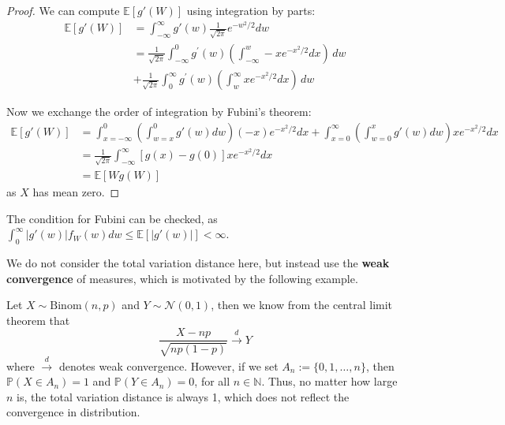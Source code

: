 \documentclass{article}
\begin{document}
\begin{proof}
    We can compute $\mathbb{E}[g'(W)]$ using integration by parts:
    \begin{align*}
        \mathbb{E}[g'(W)] &= \int_{-\infty}^\infty g'(w) \frac{1}{\sqrt{2\pi}} e^{-w^2/2} dw\\
        &= {\frac{1}{\sqrt{2\pi}}}\int_{-\infty}^{0}g^{\prime}(w)\left(\int_{-\infty}^{w}-x e^{-x^{2}/2}d x\right)\,d w \\
        &+ {\frac{1}{\sqrt{2\pi}}}\int_{0}^{\infty}g^{\prime}(w)\left(\int_{w}^{\infty}x e^{-x^{2}/2}d x\right)\,d w
    \end{align*}

    Now we exchange the order of integration by Fubini's theorem:
    \begin{align*}
        \mathbb{E}[g'(W)] &= \int_{x=-\infty}^0 \left(\int_{w=x}^0 g'(w) dw\right) (-x) e^{-x^2/2} dx + \int_{x=0}^\infty \left(\int_{w=0}^x g'(w) dw\right) xe^{-x^2/2} dx\\
        &={\frac{1}{\sqrt{2\pi}}}\int_{-\infty}^{\infty}[g(x)-g(0)]x e^{-x^{2}/2}d x \\
        &=\mathbb{E}[W g(W)]
    \end{align*}
    as $X$ has mean zero.
\end{proof}

\begin{unexaminable}
    The condition for Fubini can be checked, as $\int_0^\infty |g'(w)| f_W(w) dw \leq \mathbb{E}[|g'(w)|] < \infty$.
\end{unexaminable}

We do not consider the total variation distance here, but instead use the \textbf{weak convergence} of measures, which is motivated by the following example.  

\begin{example}

    Let $X\sim \mathrm{Binom}(n,p)$ and $Y\sim \mathcal{N}(0,1)$, then we know from the central limit theorem that
    \begin{equation*}
        \frac{X-np}{\sqrt{np(1-p)}} \xrightarrow{d} Y
    \end{equation*}
    where $\xrightarrow{d}$ denotes weak convergence. However, if we set $A_n :=\{0, 1, \ldots, n\}$, then $\mathbb{P}(X\in A_n) = 1$ and $\mathbb{P}(Y\in A_n) = 0$, for all $n\in \mathbb{N}$. Thus, no matter how large $n$ is, the total variation distance is always 1, which does not reflect the convergence in distribution.  
\end{example}
\end{document}

